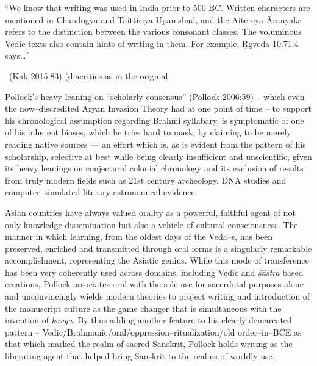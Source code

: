 \begin{myquote}
“We know that writing was used in India prior to 500 BC. Written characters are mentioned in Chāndogya and Taittirīya Upanishad, and the Aitereya Āranyaka refers to the distinction between the various consonant classes. The voluminous Vedic texts also contain hints of writing in them. For example, Ṛgveda 10.71.4 says…” 

~\hfill (Kak 2015:83) (diacritics as in the original
\end{myquote}

Pollock’s heavy leaning on “scholarly consensus” (Pollock 2006:59) – which even the now–discredited Aryan Invasion Theory had at one point of time – to support his chronological assumption regarding Brahmi syllabary, is symptomatic of one of his inherent biases, which he tries hard to mask, by claiming to be merely reading native sources — an effort which is, as is evident from the pattern of his scholarship, selective at best while being clearly insufficient and unscientific, given its heavy leanings on conjectural colonial chronology and its exclusion of results from truly modern fields such as 21st century archeology, DNA studies and computer–simulated literary astronomical evidence.

Asian countries have always valued orality as a powerful, faithful agent of not only knowledge dissemination but also a vehicle of cultural consciousness. The manner in which learning, from the oldest days of the Veda–s, has been preserved, enriched and transmitted through oral forms is a singularly remarkable accomplishment, representing the Asiatic genius. While this mode of transference has been very coherently used across domains, including Vedic and \textit{śāstra} based creations, Pollock associates oral with the sole use for sacerdotal purposes alone and unconvincingly wields modern theories to project writing and introduction of the manuscript culture as the game changer that is simultaneous with the invention of \textit{kāvya}. By thus adding another feature to his clearly demarcated pattern – Vedic/Brahmanic/oral/oppression–ritualization/old order–in–BCE as that which marked the realm of sacred Sanskrit, Pollock holds writing as the liberating agent that helped bring Sanskrit to the realms of worldly use.

